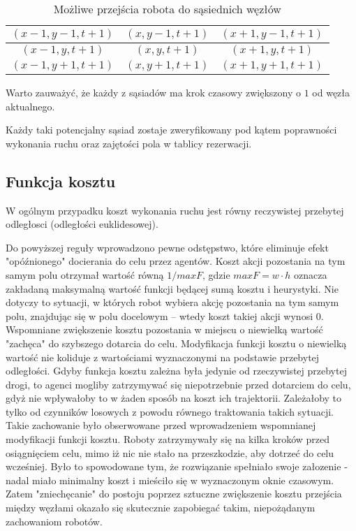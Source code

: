 \begin{table}[H]
\caption{Możliwe przejścia robota do sąsiednich węzłów} \label{tab:node-neighbours} 
\centering
\begin{tabular}{| c | c | c |}
\hline
$(x-1, y-1, t+1)$ & $(x, y-1, t+1)$ & $(x+1, y-1, t+1)$ \\ \hline
$(x-1, y, t+1)$   & $(x, y, t+1)$   & $(x+1, y, t+1)$   \\ \hline
$(x-1, y+1, t+1)$ & $(x, y+1, t+1)$ & $(x+1, y+1, t+1)$ \\ \hline
\end{tabular}
\end{table}
Warto zauważyć, że każdy z sąsiadów ma krok czasowy zwiększony o $1$ od węzła aktualnego.

Każdy taki potencjalny sąsiad zostaje zweryfikowany pod kątem poprawności wykonania ruchu oraz zajętości pola w tablicy rezerwacji.

\subsection{Funkcja kosztu}
W ogólnym przypadku koszt wykonania ruchu jest równy reczywistej przebytej odległosci (odległości euklidesowej).

Do powyższej reguły wprowadzono pewne odstępstwo, które eliminuje efekt "opóźnionego" docierania do celu przez agentów.
Koszt akcji pozostania na tym samym polu otrzymał wartość równą $1 / maxF$, gdzie $maxF = w \cdot h$ oznacza zakładaną maksymalną wartość funkcji będącej sumą kosztu i heurystyki.
Nie dotyczy to sytuacji, w których robot wybiera akcję pozostania na tym samym polu, znajdując się w polu docelowym -- wtedy koszt takiej akcji wynosi 0.
Wspomniane zwiększenie kosztu pozostania w miejscu o niewielką wartość "zachęca" do szybszego dotarcia do celu.
Modyfikacja funkcji kosztu o niewielką wartość nie koliduje z wartościami wyznaczonymi na podstawie przebytej odległości.
Gdyby funkcja kosztu zależna była jedynie od rzeczywistej przebytej drogi, to agenci mogliby zatrzymywać się niepotrzebnie przed dotarciem do celu, gdyż nie wpływałoby to w żaden sposób na koszt ich trajektorii. Zależałoby to tylko od czynników losowych z powodu równego traktowania takich sytuacji.
Takie zachowanie było obserwowane przed wprowadzeniem wspomnianej modyfikacji funkcji kosztu.
Roboty zatrzymywały się na kilka kroków przed osiągnięciem celu, mimo iż nic nie stało na przeszkodzie, aby dotrzeć do celu wcześniej. Było to spowodowane tym, że rozwiązanie spełniało swoje załozenie - nadal miało minimalny koszt i mieściło się w wyznaczonym oknie czasowym.
Zatem "zniechęcanie" do postoju poprzez sztuczne zwiększenie kosztu przejścia między węzłami okazało się skutecznie zapobiegać takim, niepożądanym zachowaniom robotów.

